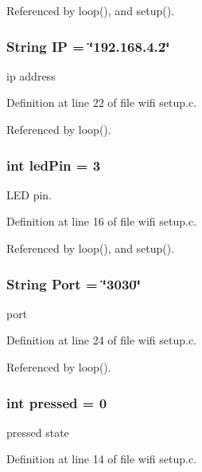Referenced by loop(), and setup().
\subsubsection{\setlength{\rightskip}{0pt plus 5cm}String {\bf IP} = \char`\"{}192.168.4.2\char`\"{}}\label{wifi_01setup_8c_a12a3079e14ced46e69ba52b8a90b21a}


ip address 



Definition at line 22 of file wifi setup.c.

Referenced by loop().
\subsubsection{\setlength{\rightskip}{0pt plus 5cm}int {\bf led\-Pin} = 3}\label{wifi_01setup_8c_08571f2409ba4af9200c2c471a9e6e1d}


LED pin. 



Definition at line 16 of file wifi setup.c.

Referenced by loop(), and setup().
\subsubsection{\setlength{\rightskip}{0pt plus 5cm}String {\bf Port} = \char`\"{}3030\char`\"{}}\label{wifi_01setup_8c_60aaf44d4b562252c04db7f98497e9aa}


port 



Definition at line 24 of file wifi setup.c.

Referenced by loop().
\subsubsection{\setlength{\rightskip}{0pt plus 5cm}int {\bf pressed} = 0}\label{wifi_01setup_8c_6375592a2d987630e9bf9afd9e7de973}


pressed state 



Definition at line 14 of file wifi setup.c.

